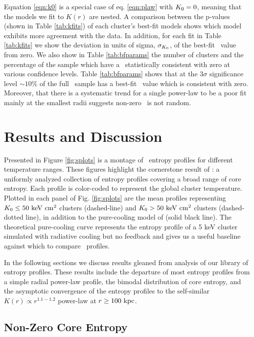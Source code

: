\documentclass[12pt,preprint]{aastex}
\begin{document}
Equation \ref{eqn:k0} is a special case of eq. \ref{eqn:plaw} with
$K_0 = 0$, meaning that the models we fit to $K(r)$ are nested. A
comparison between the p-values (shown in Table \ref{tab:kfits}) of
each cluster's best-fit models shows which model exhibits more
agreement with the data. In addition, for each fit in Table
\ref{tab:kfits} we show the deviation in units of sigma,
$\sigma_{K_0}$, of the best-fit \kna\ value from zero. We also show
in Table \ref{tab:bfparams} the number of clusters and the percentage
of the sample which have a \kna\ statistically consistent with zero at
various confidence levels. Table \ref{tab:bfparams} shows that at the
$3\sigma$ significance level $\sim10\%$ of the full \accept\ sample
has a best-fit \kna\ value which is consistent with zero. Moreover,
that there is a systematic trend for a single power-law to be a poor
fit mainly at the smallest radii suggests non-zero \kna\ is not
random.

\section{Results and Discussion}
\label{sec:r&d}

Presented in Figure \ref{fig:splots} is a montage of \accept\ entropy
profiles for different temperature ranges. These figures highlight the
cornerstone result of \accept: a uniformly analyzed collection of
entropy profiles covering a broad range of core entropy. Each profile
is color-coded to represent the global cluster temperature. Plotted in
each panel of Fig. \ref{fig:splots} are the mean profiles representing
$K_0 \le 50 \mathrm{\mbox{\ensuremath{\mathrm{~keV}}} \mathrm{\mbox{\ensuremath{\mathrm{~cm}}}^2}}$ clusters (dashed-line) and $K_0 > 50 \mathrm{\mbox{\ensuremath{\mathrm{~keV}}} \mathrm{\mbox{\ensuremath{\mathrm{~cm}}}^2}}$
clusters (dashed-dotted line), in addition to the pure-cooling model
of \citet{voitbryan} (solid black line). The theoretical pure-cooling
curve represents the entropy profile of a 5 keV cluster simulated with
radiative cooling but no feedback and gives us a useful baseline
against which to compare \accept\ profiles.

In the following sections we discuss results gleaned from analysis of
our library of entropy profiles. These results include the departure
of most entropy profiles from a simple radial power-law profile, the
bimodal distribution of core entropy, and the asymptotic convergence
of the entropy profiles to the self-similar $K(r) \propto r^{1.1-1.2}$
power-law at $r \geq 100\mbox{\ensuremath{\mathrm{~kpc}}}$.

\subsection{Non-Zero Core Entropy}
\label{sec:nonzerok0}
\end{document}
